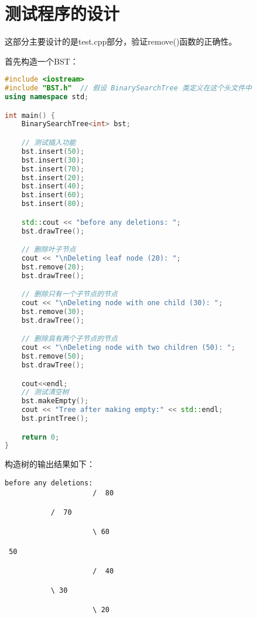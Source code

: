 \documentclass[fontset=fandol]{ctexart}
\begin{document}
\section{测试程序的设计}
这部分主要设计的是test.cpp部分，验证remove()函数的正确性。\par
首先构造一个BST：
\begin{lstlisting}[language=C++, caption={testBinarySearchTree()测试函数}]  
#include <iostream>
#include "BST.h"  // 假设 BinarySearchTree 类定义在这个头文件中
using namespace std;

int main() {
    BinarySearchTree<int> bst;

    // 测试插入功能
    bst.insert(50);
    bst.insert(30);
    bst.insert(70);
    bst.insert(20);
    bst.insert(40);
    bst.insert(60);
    bst.insert(80);

    std::cout << "before any deletions: ";
    bst.drawTree();

    // 删除叶子节点
    cout << "\nDeleting leaf node (20): ";
    bst.remove(20);
    bst.drawTree();

    // 删除只有一个子节点的节点
    cout << "\nDeleting node with one child (30): ";
    bst.remove(30);
    bst.drawTree();

    // 删除具有两个子节点的节点
    cout << "\nDeleting node with two children (50): ";
    bst.remove(50);
    bst.drawTree();

    cout<<endl;
    // 测试清空树
    bst.makeEmpty();
    cout << "Tree after making empty:" << std::endl;
    bst.printTree();

    return 0;
}
\end{lstlisting}
构造树的输出结果如下：
\begin{verbatim}  
before any deletions: 
                     /  80

           /  70

                     \ 60

 50

                     /  40

           \ 30

                     \ 20

\end{verbatim}
\end{document}

